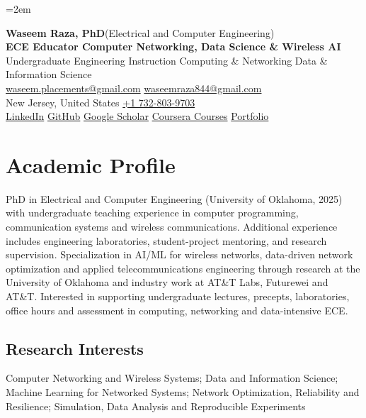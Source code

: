 \documentclass[9pt,letterpaper]{extarticle}
\begin{document}
\emergencystretch=2em
\begin{center}
{\LARGE\bfseries Waseem Raza, PhD}{\normalsize\mdseries \enspace (Electrical and Computer Engineering)}\\[2pt]
{\large\bfseries ECE Educator \textbar{} Computer Networking, Data Science \& Wireless AI}\\[1pt]
{\small Undergraduate Engineering Instruction \textbar{} Computing \& Networking \textbar{} Data \& Information Science}\\[3pt]
{\footnotesize {}\enspace \href{mailto:waseem.placements@gmail.com}{waseem.placements@gmail.com} \textbar{} \href{mailto:waseemraza844@gmail.com}{waseemraza844@gmail.com}\\[1pt]New Jersey, United States \quad {}\enspace \href{tel:+17328039703}{+1 732-803-9703}\\[1pt]\href{https://www.linkedin.com/in/waseem-raza-phd-9a737858/}{LinkedIn} \textbar{} \href{https://github.com/WaseemRaza844}{GitHub} \textbar{} \href{https://scholar.google.com/citations?user=d58Drr0AAAAJ\&hl=en}{Google Scholar} \textbar{} \href{https://waseemraza844.github.io/portfolio/learning.html}{Coursera Courses} \textbar{} \href{https://waseemraza844.github.io/portfolio/}{Portfolio}}
\end{center}
\vspace{-5pt}
\section{Academic Profile}
PhD in Electrical and Computer Engineering (University of Oklahoma, 2025) with undergraduate teaching experience in computer programming, communication systems and wireless communications. Additional experience includes engineering laboratories, student-project mentoring, and research supervision. Specialization in AI/ML for wireless networks, data-driven network optimization and applied telecommunications engineering through research at the University of Oklahoma and industry work at AT\&T Labs, Futurewei and AT\&T. Interested in supporting undergraduate lectures, precepts, laboratories, office hours and assessment in computing, networking and data-intensive ECE.
\subsection{Research Interests}
Computer Networking and Wireless Systems; Data and Information Science; Machine Learning for Networked Systems; Network Optimization, Reliability and Resilience; Simulation, Data Analysis and Reproducible Experiments\par
{}
\end{document}
